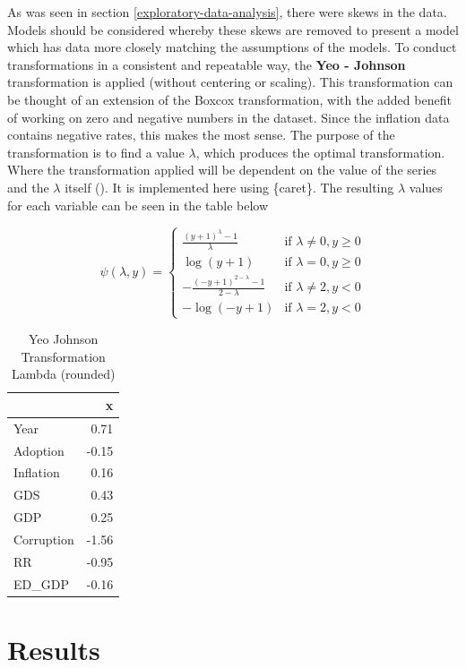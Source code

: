 \documentclass[
]{article}
\begin{document}
As was seen in section \ref{exploratory-data-analysis}, there were skews in the data. Models should be considered whereby these skews are removed to present a model which has data more closely matching the assumptions of the models. To conduct transformations in a consistent and repeatable way, the \textbf{Yeo - Johnson} transformation is applied (without centering or scaling). This transformation can be thought of an extension of the Boxcox transformation, with the added benefit of working on zero and negative numbers in the dataset. Since the inflation data contains negative rates, this makes the most sense. The purpose of the transformation is to find a value \(\lambda\), which produces the optimal transformation. Where the transformation applied will be dependent on the value of the series and the \(\lambda\) itself (). It is implemented here using \{caret\}. The resulting \(\lambda\) values for each variable can be seen in the table below

\[
\psi(\lambda, y) =
\begin{cases} 
\frac{(y+1)^\lambda - 1}{\lambda} & \text{if } \lambda \neq 0, y \geq 0 \\ 
\log(y+1) & \text{if } \lambda = 0, y \geq 0 \\ 
-\frac{(-y+1)^{2-\lambda} - 1}{2 - \lambda} & \text{if } \lambda \neq 2, y < 0 \\ 
-\log(-y+1) & \text{if } \lambda = 2, y < 0 
\end{cases}
\]

\begin{table}[!h]
\centering
\caption{\label{tab:YJ-Transformations-Presentation}Yeo Johnson Transformation Lambda (rounded)}
\centering
\begin{tabular}[t]{lr}
\toprule
  & x\\
\midrule
Year & 0.71\\
Adoption & -0.15\\
Inflation & 0.16\\
GDS & 0.43\\
GDP & 0.25\\
\addlinespace
Corruption & -1.56\\
RR & -0.95\\
ED_GDP & -0.16\\
\bottomrule
\end{tabular}
\end{table}

\newpage

\section{Results}\label{results}
\end{document}
